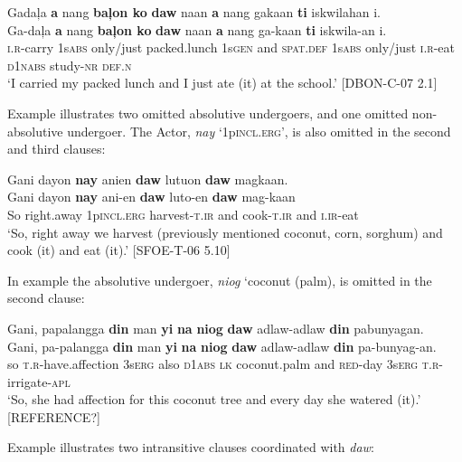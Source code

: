 \ea
\label{ex:attheschool}
Gada\c{l}a \textbf{a} nang \textbf{ba\c{l}on ko} \textbf{daw} naan \textbf{a} nang gakaan \textbf{ti} iskwilahan i. \\
\vspace{4pt} \gll Ga-da\c{l}a \textbf{a} nang \textbf{ba\c{l}on ko} \textbf{daw} naan \textbf{a} nang ga-kaan \textbf{ti} iskwila-an i. \\
\textsc{i.r}-carry 1s\textsc{abs} only/just packed.lunch 1s\textsc{gen} and \textsc{spat.def} 1s\textsc{abs} only/just \textsc{i.r}-eat \textsc{d1nabs} study-\textsc{nr} \textsc{def.n}\\
\glt ‘I carried my packed lunch and I just ate (it) at the school.’ [DBON-C-07 2.1]
\z

Example  illustrates two omitted absolutive undergoers, and one omitted non-absolutive undergoer. The Actor, \textit{nay} `1p\textsc{incl.erg}', is also omitted in the second and third clauses:

\ea
\label{ex:andateit}
Gani	dayon		\textbf{nay} anien 			\textbf{daw} lutuon		\textbf{daw}	magkaan. \\
\vspace{4pt}
\gll Gani	dayon		\textbf{nay} ani-en			\textbf{daw} luto-en	\textbf{daw}	mag-kaan\\
So 	right.away	1p\textsc{incl.erg} harvest-\textsc{t.ir} 	and cook-\textsc{t.ir} 		 and	\textsc{i.ir}-eat \\
\glt `So, right away we harvest (previously mentioned coconut, corn, sorghum) and cook (it) and eat (it).' [SFOE-T-06 5.10]
\z

In example  the absolutive undergoer, \textit{niog} `coconut (palm), is omitted in the second clause:

\ea
\label{ex:shewateredit}
Gani, papalangga \textbf{din} man \textbf{yi} \textbf{na} \textbf{niog} \textbf{daw} adlaw-adlaw \textbf{din} pabunyagan. \\
\vspace{4pt} \gll Gani, pa-palangga \textbf{din} man \textbf{yi} \textbf{na} \textbf{niog} \textbf{daw} adlaw-adlaw \textbf{din} pa-bunyag-an. \\
so \textsc{t.r}-have.affection 3s\textsc{erg} also \textsc{d1abs} \textsc{lk} coconut.palm and \textsc{red}-day 3s\textsc{erg}   \textsc{t.r}-irrigate-\textsc{apl} \\
\glt ‘So, she had affection for this coconut tree and every day she watered (it).’ [REFERENCE?]
\z

Example  illustrates two intransitive clauses coordinated with \textit{daw}:
 
